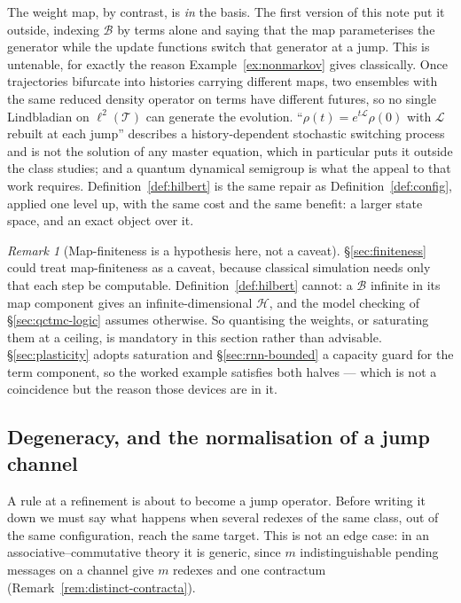 \documentclass[11pt,a4paper]{article}
\theoremstyle{plain}
\theoremstyle{definition}
\theoremstyle{remark}
\newtheorem{remark}[theorem]{Remark}
\newcommand{\Terms}{\mathcal{T}}
\begin{document}
The weight map, by contrast, is \emph{in} the basis. The first version of this note put it outside,
indexing $\mathcal{B}$ by terms alone and saying that the map parameterises the generator while the
update functions switch that generator at a jump. This is untenable, for exactly the reason
Example~\ref{ex:nonmarkov} gives classically. Once trajectories bifurcate into histories carrying
different maps, two ensembles with the same reduced density operator on terms have different futures,
so no single Lindbladian on $\ell^2(\Terms)$ can generate the evolution. ``$\rho(t) =
e^{t\mathcal{L}}\rho(0)$ with $\mathcal{L}$ rebuilt at each jump'' describes a history-dependent
stochastic switching process and is not the solution of any master equation, which in particular puts
it outside the class \cite{qctmc} studies; and a quantum dynamical semigroup is what the appeal to
that work requires. Definition~\ref{def:hilbert} is the same repair as Definition~\ref{def:config},
applied one level up, with the same cost and the same benefit: a larger state space, and an exact
object over it.

\begin{remark}[Map-finiteness is a hypothesis here, not a caveat]
\label{rem:map-finite}
\S\ref{sec:finiteness} could treat map-finiteness as a caveat, because classical simulation needs
only that each step be computable. Definition~\ref{def:hilbert} cannot: a $\mathcal{B}$ infinite in
its map component gives an infinite-dimensional $\mathcal{H}$, and the model checking of
\S\ref{sec:qctmc-logic} assumes otherwise. So quantising the weights, or saturating them at a
ceiling, is mandatory in this section rather than advisable. \S\ref{sec:plasticity} adopts saturation
and \S\ref{sec:rnn-bounded} a capacity guard for the term component, so the worked example satisfies
both halves --- which is not a coincidence but the reason those devices are in it.
\end{remark}

\subsection{Degeneracy, and the normalisation of a jump channel}
\label{sec:bosonic}

A rule at a refinement is about to become a jump operator. Before writing it down we must say what
happens when several redexes of the same class, out of the same configuration, reach the same
target. This is not an edge case: in an associative--commutative theory it is generic, since $m$
indistinguishable pending messages on a channel give $m$ redexes and one contractum
(Remark~\ref{rem:distinct-contracta}).
\end{document}
